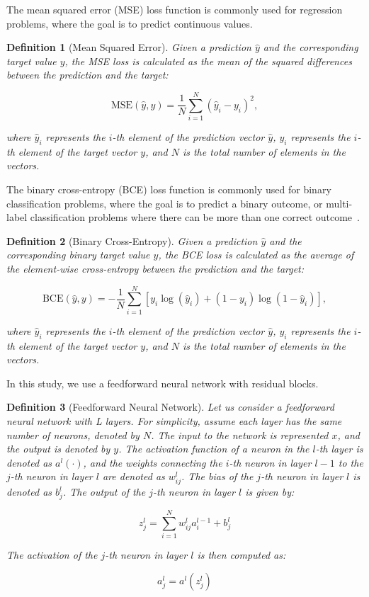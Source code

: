 \documentclass[ppgc,diss,english]{iiufrgs}
\newtheorem{definition}{Definition}
\begin{document}
The mean squared error (MSE) loss function is commonly used for regression problems, where the goal is to predict continuous values.
\begin{definition}[Mean Squared Error]\label{def:mse}
Given a prediction $\hat{y}$ and the corresponding target value $y$, the MSE loss is calculated as the mean of the squared differences between the prediction and the target:

$$\text{MSE}(\hat{y}, y) = \frac{1}{N} \sum_{i=1}^{N} (\hat{y}_i - y_i)^2,$$

where $\hat{y}_i$ represents the $i$-th element of the prediction vector $\hat{y}$, $y_i$ represents the $i$-th element of the target vector $y$, and $N$ is the total number of elements in the vectors.
\end{definition}

The binary cross-entropy (BCE) loss function is commonly used for binary classification problems, where the goal is to predict a binary outcome, or multi-label classification problems where there can be more than one correct outcome~\cite{Tsoumakas.etal/2007}.
\begin{definition}[Binary Cross-Entropy]\label{def:mse}
Given a prediction $\hat{y}$ and the corresponding binary target value $y$, the BCE loss is calculated as the average of the element-wise cross-entropy between the prediction and the target:

$$\text{BCE}(\hat{y}, y) = -\frac{1}{N} \sum_{i=1}^{N} \left[y_i \log(\hat{y}_i) + (1 - y_i) \log(1 - \hat{y}_i)\right],$$

where $\hat{y}_i$ represents the $i$-th element of the prediction vector $\hat{y}$, $y_i$ represents the $i$-th element of the target vector $y$, and $N$ is the total number of elements in the vectors.
\end{definition}

In this study, we use a feedforward neural network with residual blocks.

\begin{definition}[Feedforward Neural Network]
Let us consider a feedforward neural network with L layers. For simplicity, assume each layer has the same number of neurons, denoted by $N$. The input to the network is represented $x$, and the output is denoted by $y$. The activation function of a neuron in the $l$-th layer is denoted as $a^l(\cdot)$, and the weights connecting the $i$-th neuron in layer $l-1$ to the $j$-th neuron in layer $l$ are denoted as $w^{l}_{ij}$. The bias of the $j$-th neuron in layer $l$ is denoted as $b^{l}_{j}$. The output of the $j$-th neuron in layer $l$ is given by:

$$z^{l}_{j} = \sum_{i=1}^{N} w^{l}_{ij} a^{l-1}_{i} + b^{l}_{j}$$

The activation of the $j$-th neuron in layer $l$ is then computed as:

$$a^{l}_{j} = a^{l}(z^{l}_{j})$$
\end{definition}
\end{document}
